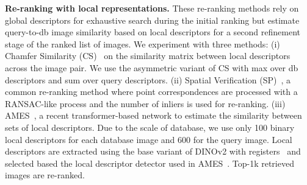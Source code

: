 \noindent\textbf{Re-ranking with local representations.}
These re-ranking methods rely on global descriptors for exhaustive search during the initial ranking but estimate query-to-db image similarity based on local descriptors for a second refinement stage of the ranked list of images.
We experiment with three methods: (i) Chamfer Similarity (CS)~\cite{rsa+14, btb+77} on the similarity matrix between local descriptors across the image pair. We use the asymmetric variant of CS with max over db descriptors and sum over query descriptors. (ii) Spatial Verification (SP)~\cite{fib+81, pci+07,cas20}, a common re-ranking method where point correspondences are processed with a RANSAC-like process and the number of inliers is used for re-ranking. (iii) AMES~\cite{ski+24}, a recent transformer-based network to estimate the similarity between sets of local descriptors. 
Due to the scale of \ours database, we use only 100 binary local descriptors for each database image and 600 for the query image.
Local descriptors are extracted using the base variant of DINOv2 with registers~\cite{odm+24,doj+23} and selected based the local descriptor detector used in AMES~\cite{ski+24}. Top-1k retrieved images are re-ranked.
